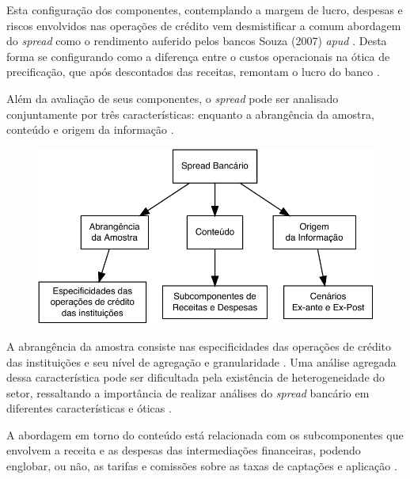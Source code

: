 \documentclass[12pt,12pt,openright,oneside,a4paper,chapter=TITLE,section=TITLE,subsection=TITLE,subsubsection=TITLE,english,french,spanish,portugues,sumario=tradicional]{abntex2}
\begin{document}
Esta configuração dos componentes, contemplando a margem de lucro, despesas e
riscos envolvidos nas operações de crédito vem desmistificar a comum abordagem
do \emph{spread} como o rendimento auferido pelos bancos \cite{costa;nakane:2004}
Souza (2007) \emph{apud} \cite{dantas:2012}. Desta forma se configurando como a
diferença entre o custos operacionais na ótica de precificação, que após
descontados das receitas, remontam o lucro do banco \cite{BCB:2016}.

Além da avaliação de seus componentes, o \emph{spread} pode ser analisado
conjuntamente por três características: enquanto a abrangência da amostra,
conteúdo e origem da informação \cite{leal:2006}.

\begin{figure}

\begin{center}\includegraphics{12-exportedfigures/diagram.spread.carac-1} \end{center}
\label{fig:diagramb}
\end{figure}

A abrangência da amostra consiste nas especificidades das operações de crédito das instituições e seu nível de agregação e granularidade \cite{costa;nakane:2004}. Uma análise agregada dessa característica pode ser dificultada pela existência de heterogeneidade do setor, ressaltando a importância de realizar análises do \emph{spread} bancário em diferentes características e óticas \cite{block:2000}.

A abordagem em torno do conteúdo está relacionada com os subcomponentes que
envolvem a receita e as despesas das intermediações financeiras, podendo
englobar, ou não, as tarifas e comissões sobre as taxas de captações e
aplicação \cite{block:2000}.
\end{document}
